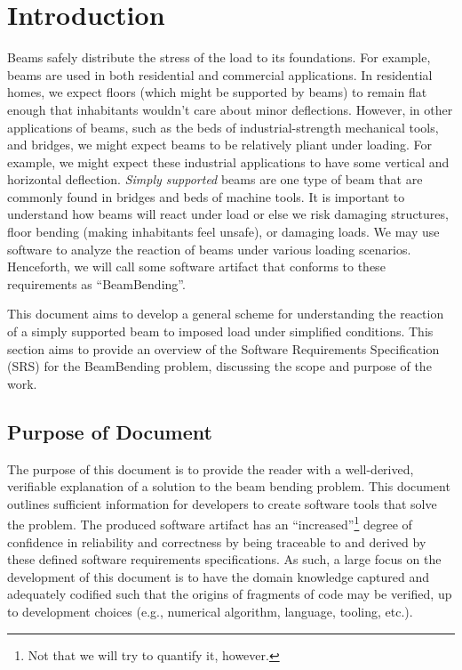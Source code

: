 \documentclass[12pt]{article}
\begin{document}
\section{Introduction}

Beams safely distribute the stress of the load to its foundations. For example,
beams are used in both residential and commercial applications. In residential
homes, we expect floors (which might be supported by beams) to remain flat
enough that inhabitants wouldn't care about minor deflections. However, in other
applications of beams, such as the beds of industrial-strength mechanical tools,
and bridges, we might expect beams to be relatively pliant under loading. For
example, we might expect these industrial applications to have some vertical and
horizontal deflection. \textit{Simply supported} beams are one type of beam that
are commonly found in bridges and beds of machine tools. It is important to
understand how beams will react under load or else we risk damaging structures,
floor bending (making inhabitants feel unsafe), or damaging loads. We may use
software to analyze the reaction of beams under various loading scenarios.
Henceforth, we will call some software artifact that conforms to these
requirements as ``BeamBending''.

This document aims to develop a general scheme for understanding the reaction of
a simply supported beam to imposed load under simplified conditions. This
section aims to provide an overview of the Software Requirements Specification
(SRS) for the BeamBending problem, discussing the scope and purpose of the work.

\subsection{Purpose of Document}

The purpose of this document is to provide the reader with a well-derived,
verifiable explanation of a solution to the beam bending problem. This document
outlines sufficient information for developers to create software tools that
solve the \progname{} problem. The produced software artifact has an
``increased''\footnote{Not that we will try to quantify it, however.} degree of
confidence in reliability and correctness by being traceable to and derived by
these defined software requirements specifications. As such, a large focus on
the development of this document is to have the domain knowledge captured and
adequately codified such that the origins of fragments of code may be verified,
up to development choices (e.g., numerical algorithm, language, tooling, etc.).
\end{document}
